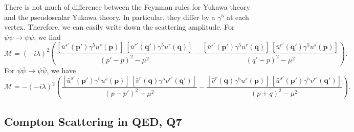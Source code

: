 \begin{solution}
    There is not much of difference between the Feynman rules for Yukawa theory and the pseudoscalar Yukawa theory. In particular, they differ by a $\gamma^5$ at each vertex. Therefore, we can easily write down the scattering amplitude. For $\psi\psi\to\psi\psi$, we find
    \begin{equation}
        \mathcal{M} = (-i\lambda)^2\left(\frac{[\bar{u}^{s'}(\mathbf{p}')\gamma^5 u^s(\mathbf{p})]\,[\bar{u}^{r'}(\mathbf{q}')\gamma^5 u^r(\mathbf{q})]}{(p'-p)^2-\mu^2} - \frac{[\bar{u}^{s'}(\mathbf{p}')\gamma^5 u^r(\mathbf{q})]\,[\bar{u}^{r'}(\mathbf{q}')\gamma^5 u^s(\mathbf{p})]}{(q'-p)^2-\mu^2}\right).
    \end{equation}
    For $\psi\bar\psi\to\psi\bar\psi$, we have
    \begin{equation}
        \mathcal{M} = -(-i\lambda)^2\left(\frac{[\bar{u}^{s'}(\mathbf{p}') \gamma^5u^s(\mathbf{p})]\,[\bar{v}^r(\mathbf{q})\gamma^5 v^{r'}(\mathbf{q}')]}{(p-p')^2-\mu^2} - \frac{[\bar{v}^r(\mathbf{q})\gamma^5 u^s(\mathbf{p})]\,[\bar{u}^{s'}(\mathbf{p}')\gamma^5 v^{r'}(\mathbf{q}')]}{(p+q)^2-\mu^2}\right).
    \end{equation}
\end{solution}


\subsection{Compton Scattering in QED, Q7}

